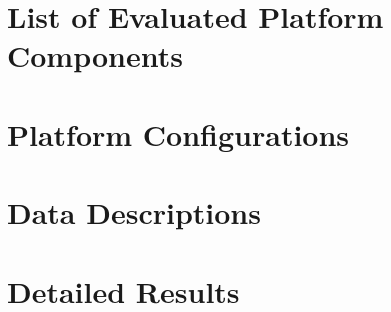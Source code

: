 \chapter{List of Evaluated Platform Components}
\label{chapter:first-appendixa}





\chapter{Platform Configurations}
\label{chapter:appendixb}

\chapter{Data Descriptions}
\label{chapter:appendixc}

\chapter{Detailed Results}
\label{chapter:appendixd}



